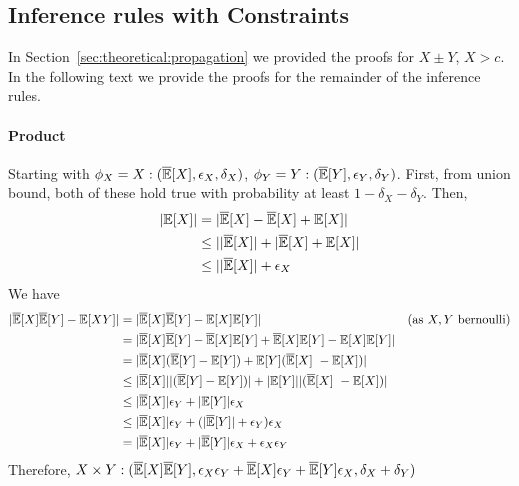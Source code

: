 \subsection{Inference rules with Constraints}
\label{sec:appendix:constraint:proofs}

In Section~\ref{sec:theoretical:propagation} we provided the proofs for $X\pm Y$, $X > c$.
In the following text we provide the proofs for the remainder of the inference rules. 

\paragraph{Product} Starting with $\phi_X = X: (\BarE[X], \epsilon_X, \delta_X)$, $\phi_Y = Y: (\BarE[Y], \epsilon_Y, \delta_Y)$. 
First, from union bound, both of these hold true with probability at least $1 - \delta_X - \delta_Y$.
Then,
\begin{align*}
|\E[X]| &= |\BarE[X] - \BarE[X] + \E[X]|\\
        &\leq ||\BarE[X]| +  |\BarE[X] + \E[X]| \\
        &\leq ||\BarE[X]| + \epsilon_X \\
\end{align*}
We have
\begin{align*}
    |\BarE[X]\BarE[Y] - \E[XY]| &=  |\BarE[X]\BarE[Y]  - \E[X]\E[Y]| & \text{(as $X, Y$ bernoulli)}\\
    &= |\BarE[X]\BarE[Y] - \BarE[X]\E[Y] + \BarE[X]\E[Y]  - \E[X]\E[Y]| \\
    &= |\BarE[X](\BarE[Y] - \E[Y]) + \E[Y] (\BarE[X]\  - \E[X])| \\
    &\leq |\BarE[X]||(\BarE[Y] - \E[Y])| + |\E[Y]||(\BarE[X]\  - \E[X])| \\
    &\leq |\BarE[X]| \eps_Y + |\E[Y]| \eps_X \\
    &\leq |\BarE[X]| \eps_Y + (|\BarE[Y]| + \eps_Y) \eps_X \\
    &= |\BarE[X]| \eps_Y + |\BarE[Y]| \eps_X + \eps_X \eps_Y
\end{align*}
Therefore, $X \times Y: (\BarE[X] \BarE[Y], \epsilon_X \epsilon_Y + \BarE[X] \epsilon_Y + \BarE[Y] \epsilon_X, \delta_X + \delta_Y)$

